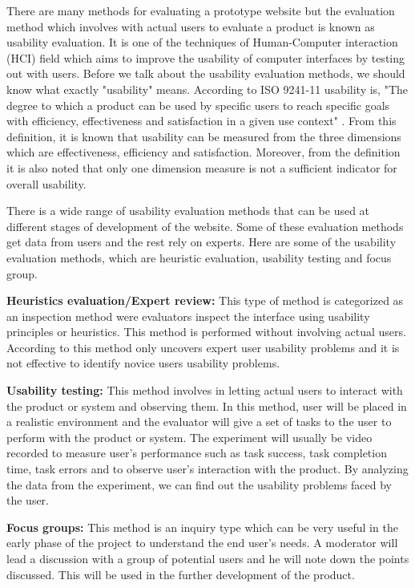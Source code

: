 \documentclass[mscthesis]{usiinfthesis}
\begin{document}
There are many methods for evaluating a prototype website but the evaluation method which involves with actual users to evaluate a product is known as usability evaluation. It is one of the techniques of Human-Computer interaction (HCI) field which aims to improve the usability of computer interfaces by testing out with users. Before we talk about the usability evaluation methods, we should know what exactly "usability" means. According to ISO 9241-11 usability is, "The degree to which a product can be used by specific users to reach specific goals with efficiency, effectiveness and satisfaction in a given use context" \cite{smith_iso_1996}. From this definition, it is known that usability can be measured from the three dimensions which are effectiveness, efficiency and satisfaction. Moreover, from the definition it is also noted that only one dimension measure is not a sufficient indicator for overall usability.

There is a wide range of usability evaluation methods that can be used at different stages of development of the website. Some of these evaluation methods get data from users and the rest rely on experts. Here are some of the usability evaluation methods, which are heuristic evaluation, usability testing and focus group. 
\newline

\textbf{Heuristics evaluation/Expert review:}
This type of method is categorized as an inspection method were evaluators inspect the interface using usability principles or heuristics. This method is performed without involving actual users. According to \citep{fu_effectiveness_2002} this method only uncovers expert user usability problems and it is not effective to identify novice users usability problems. 
\newline

\textbf{Usability testing:}
This method involves in letting actual users to interact with the product or system and observing them. In this method, user will be placed in a realistic environment and the evaluator will give a set of tasks to the user to perform with the product or system. The experiment will usually be video recorded to measure user's performance such as task success, task completion time, task errors and to observe user's interaction with the product. By analyzing the data from the experiment, we can find out the usability problems faced by the user.
\newline

\textbf{Focus groups: }
This method is an inquiry type which can be very useful in the early phase of the project to understand the end user's needs. A moderator will lead a discussion with a group of potential users and he will note down the points discussed. This will be used in the further development of the product.
\newline
\end{document}
